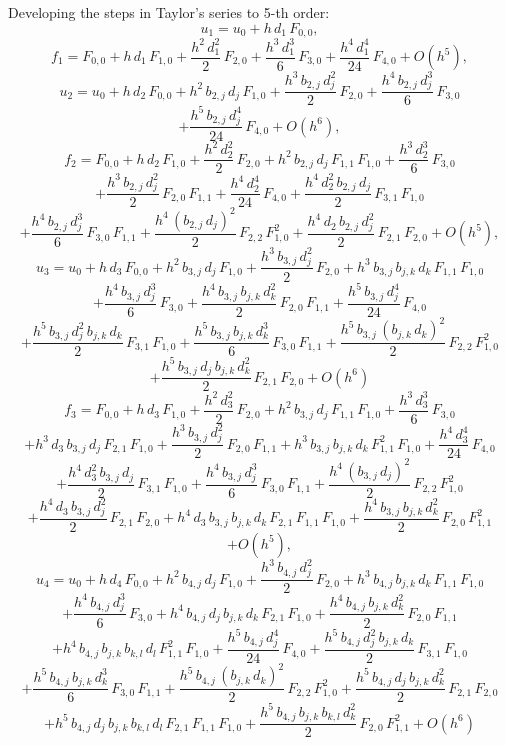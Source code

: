 \documentclass[a4paper]{article}
\newcommand{\PA}[1]{\left(#1\right)}
\begin{document}
Developing the steps in Taylor's series to 5-th order:
\[u_1=u_0+h\,d_1\,F_{0,0},\]
\[
	f_1=F_{0,0}+h\,d_1\,F_{1,0}+\frac{h^2\,d_1^2}{2}\,F_{2,0}
	+\frac{h^3\,d_1^3}{6}\,F_{3,0}+\frac{h^4\,d_1^4}{24}\,F_{4,0}+O\PA{h^5},
\]
\[
	u_2=u_0+h\,d_2\,F_{0,0}+h^2\,b_{2,j}\,d_j\,F_{1,0}
	+\frac{h^3\,b_{2,j}\,d_j^2}{2}\,F_{2,0}
	+\frac{h^4\,b_{2,j}\,d_j^3}{6}\,F_{3,0}
\]
\[	+\frac{h^5\,b_{2,j}\,d_j^4}{24}\,F_{4,0}+O\PA{h^6},\]
\[
	f_2=F_{0,0}+h\,d_2\,F_{1,0}+\frac{h^2\,d_2^2}{2}\,F_{2,0}
	+h^2\,b_{2,j}\,d_j\,F_{1,1}\,F_{1,0}+\frac{h^3\,d_2^3}{6}\,F_{3,0}
\]
\[
	+\frac{h^3\,b_{2,j}\,d_j^2}{2}\,F_{2,0}\,F_{1,1}
	+\frac{h^4\,d_2^4}{24}\,F_{4,0}
	+\frac{h^4\,d_2^2\,b_{2,j}\,d_j}{2}\,F_{3,1}\,F_{1,0}
\]
\[
	+\frac{h^4\,b_{2,j}\,d_j^3}{6}\,F_{3,0}\,F_{1,1}
	+\frac{h^4\,\PA{b_{2,j}\,d_j}^2}{2}\,F_{2,2}\,F_{1,0}^2
	+\frac{h^4\,d_2\,b_{2,j}\,d_j^2}{2}\,F_{2,1}\,F_{2,0}
	+O\PA{h^5},
\]
\[
	u_3=u_0+h\,d_3\,F_{0,0}+h^2\,b_{3,j}\,d_j\,F_{1,0}
	+\frac{h^3\,b_{3,j}\,d_j^2}{2}\,F_{2,0}
	+h^3\,b_{3,j}\,b_{j,k}\,d_k\,F_{1,1}\,F_{1,0}
\]
\[
	+\frac{h^4\,b_{3,j}\,d_j^3}{6}\,F_{3,0}
	+\frac{h^4\,b_{3,j}\,b_{j,k}\,d_k^2}{2}\,F_{2,0}\,F_{1,1}
	+\frac{h^5\,b_{3,j}\,d_j^4}{24}\,F_{4,0}
\]
\[
	+\frac{h^5\,b_{3,j}\,d_j^2\,b_{j,k}\,d_k}{2}\,F_{3,1}\,F_{1,0}
	+\frac{h^5\,b_{3,j}\,b_{j,k}\,d_k^3}{6}\,F_{3,0}\,F_{1,1}
	+\frac{h^5\,b_{3,j}\,\PA{b_{j,k}\,d_k}^2}{2}\,F_{2,2}\,F_{1,0}^2
\]
\[
	+\frac{h^5\,b_{3,j}\,d_j\,b_{j,k}\,d_k^2}{2}\,F_{2,1}\,F_{2,0}
	+O\PA{h^6}
\]
\[
	f_3=F_{0,0}+h\,d_3\,F_{1,0}+\frac{h^2\,d_3^2}{2}\,F_{2,0}
	+h^2\,b_{3,j}\,d_j\,F_{1,1}\,F_{1,0}+\frac{h^3\,d_3^3}{6}\,F_{3,0}
\]
\[
	+h^3\,d_3\,b_{3,j}\,d_j\,F_{2,1}\,F_{1,0}
	+\frac{h^3\,b_{3,j}\,d_j^2}{2}\,F_{2,0}\,F_{1,1}
	+h^3\,b_{3,j}\,b_{j,k}\,d_k\,F_{1,1}^2\,F_{1,0}
	+\frac{h^4\,d_3^4}{24}\,F_{4,0}
\]
\[
	+\frac{h^4\,d_3^2\,b_{3,j}\,d_j}{2}\,F_{3,1}\,F_{1,0}
	+\frac{h^4\,b_{3,j}\,d_j^3}{6}\,F_{3,0}\,F_{1,1}
	+\frac{h^4\,\PA{b_{3,j}\,d_j}^2}{2}\,F_{2,2}\,F_{1,0}^2
\]
\[
	+\frac{h^4\,d_3\,b_{3,j}\,d_j^2}{2}\,F_{2,1}\,F_{2,0}
	+h^4\,d_3\,b_{3,j}\,b_{j,k}\,d_k\,F_{2,1}\,F_{1,1}\,F_{1,0}
	+\frac{h^4\,b_{3,j}\,b_{j,k}\,d_k^2}{2}\,F_{2,0}\,F_{1,1}^2
\]
\[+O\PA{h^5},\]
\[
	u_4=u_0+h\,d_4\,F_{0,0}+h^2\,b_{4,j}\,d_j\,F_{1,0}
	+\frac{h^3\,b_{4,j}\,d_j^2}{2}\,F_{2,0}
	+h^3\,b_{4,j}\,b_{j,k}\,d_k\,F_{1,1}\,F_{1,0}
\]
\[
	+\frac{h^4\,b_{4,j}\,d_j^3}{6}\,F_{3,0}
	+h^4\,b_{4,j}\,d_j\,b_{j,k}\,d_k\,F_{2,1}\,F_{1,0}
	+\frac{h^4\,b_{4,j}\,b_{j,k}\,d_k^2}{2}\,F_{2,0}\,F_{1,1}
\]
\[
	+h^4\,b_{4,j}\,b_{j,k}\,b_{k,l}\,d_l\,F_{1,1}^2\,F_{1,0}
	+\frac{h^5\,b_{4,j}\,d_j^4}{24}\,F_{4,0}
	+\frac{h^5\,b_{4,j}\,d_j^2\,b_{j,k}\,d_k}{2}\,F_{3,1}\,F_{1,0}
\]
\[
	+\frac{h^5\,b_{4,j}\,b_{j,k}\,d_k^3}{6}\,F_{3,0}\,F_{1,1}
	+\frac{h^5\,b_{4,j}\,\PA{b_{j,k}\,d_k}^2}{2}\,F_{2,2}\,F_{1,0}^2
	+\frac{h^5\,b_{4,j}\,d_j\,b_{j,k}\,d_k^2}{2}\,F_{2,1}\,F_{2,0}
\]
\[
	+h^5\,b_{4,j}\,d_j\,b_{j,k}\,b_{k,l}\,d_l\,F_{2,1}\,F_{1,1}\,F_{1,0}
	+\frac{h^5\,b_{4,j}\,b_{j,k}\,b_{k,l}\,d_k^2}{2}\,F_{2,0}\,F_{1,1}^2
	+O\PA{h^6}
\]
\end{document}
